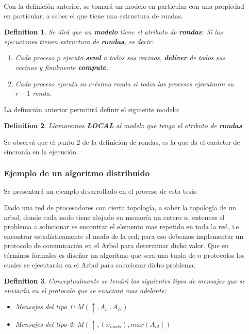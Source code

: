 \documentclass[10pt]{report}
\newtheorem{definition}{Definition}
\begin{document}
    Con la definición anterior, se tomará un modelo en particular con una propiedad en particular, a saber el que
    tiene una estructura de rondas.\newline
    \begin{definition}
        Se dirá que un \textbf{modelo} tiene el atributo de \textbf{rondas}:
        Si las ejecuciones tienen estructura de \textbf{rondas}, es decir:
        \begin{enumerate}
            \item Cada proceso $p$ ejecuta \textbf{send} a todos sus vecinos, \textbf{deliver} de todos sus vecinos y finalmente \textbf{compute},
            \item Cada proceso ejecuta su $r$-ésima ronda si todos los procesos ejecutaron su $r-1$ ronda.
        \end{enumerate}
    \end{definition}\newline
    La definición anterior permitirá definir el siguiente modelo:
    \begin{definition}
        Llamaremos \textbf{LOCAL} al modelo que tenga el atributo de \textbf{rondas}
    \end{definition}
    Se observá que el punto 2 de la definición de rondas, es la que da el carácter de
    síncronía en la ejecución.
    \subsubsection{Ejemplo de un algoritmo distribuido}
    Se presentará un ejemplo desarrollado en el proceso de esta tesis.

    \newline
    Dado una red de procesadores con cierta topología, a saber la topología de un arbol,
donde cada nodo tiene alojado en memoría un entero $n$, entonces el problema a solucionar es encontrar el
elemento mas repetido en toda la red, i.e encontrar estadísticamente el modo de la red;
para eso debemos implementar un protocolo de comunicación en el Arbol para determinar dicho valor.
Que en términos formales es diseñar un algoritmo que sera una tupla de $n$ protocolos los cuales
se ejecutarán en el Arbol para solucionar dicho problema.


\begin{definition}
    Conceptualmente se tendrá los siguientes tipos de mensajes que se enviarán en el protocolo que se enuciará mas adelante:
    \begin{itemize}
        \item Mensajes del tipo 1: $M(\uparrow, A_{i1},A_{i2}) $
        \item Mensajes del tipo 2: $ M(\uparrow,(x_{modo}), max(A_{i2}))$
    \end{itemize}
\end{definition}
\end{document}
